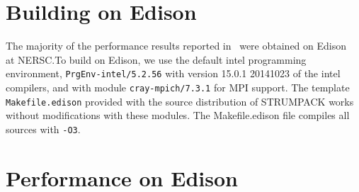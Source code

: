 \documentclass{acmsmall}
\begin{document}
\section{Building on Edison}

The majority of the performance results reported
in~\cite{rouet:strumpack} were obtained on Edison~\cite{Edison} at
NERSC.\@ To build \strumpack{} on Edison, we use the default intel
programming environment, \verb!PrgEnv-intel/5.2.56!  with version
15.0.1 20141023 of the intel compilers, and with module
\verb!cray-mpich/7.3.1! for MPI support.  The template
\verb!Makefile.edison! provided with the source distribution of
STRUMPACK works without modifications with these modules.  The
Makefile.edison file compiles all sources with \verb!-O3!.


\section{Performance on Edison}
\end{document}
